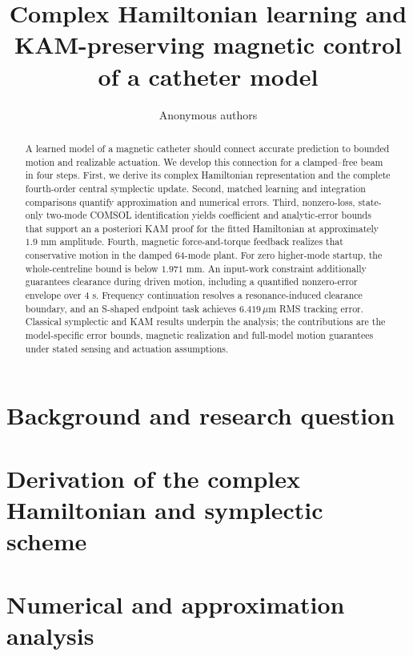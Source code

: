 \documentclass[doublespace,Afour,sageh,times]{sagej}
\theoremstyle{definition}
\begin{document}
\title{Complex Hamiltonian learning and KAM-preserving magnetic control of a catheter model}
\author{Anonymous authors}
\begin{abstract}
A learned model of a magnetic catheter should connect accurate prediction to bounded motion and realizable actuation. We develop this connection for a clamped--free beam in four steps. First, we derive its complex Hamiltonian representation and the complete fourth-order central symplectic update. Second, matched learning and integration comparisons quantify approximation and numerical errors. Third, nonzero-loss, state-only two-mode COMSOL identification yields coefficient and analytic-error bounds that support an a posteriori KAM proof for the fitted Hamiltonian at approximately $1.9$ mm amplitude. Fourth, magnetic force-and-torque feedback realizes that conservative motion in the damped $64$-mode plant. For zero higher-mode startup, the whole-centreline bound is below $1.971$ mm. An input-work constraint additionally guarantees clearance during driven motion, including a quantified nonzero-error envelope over $4$ s. Frequency continuation resolves a resonance-induced clearance boundary, and an S-shaped endpoint task achieves $6.419\,\mu$m RMS tracking error. Classical symplectic and KAM results underpin the analysis; the contributions are the model-specific error bounds, magnetic realization and full-model motion guarantees under stated sensing and actuation assumptions.
\end{abstract}
\maketitle
\raggedbottom
\section{Background and research question}
\label{sec:background}

\section{Derivation of the complex Hamiltonian and symplectic scheme}
\label{sec:derivation}

\section{Numerical and approximation analysis}
\label{sec:analysis}

\end{document}
